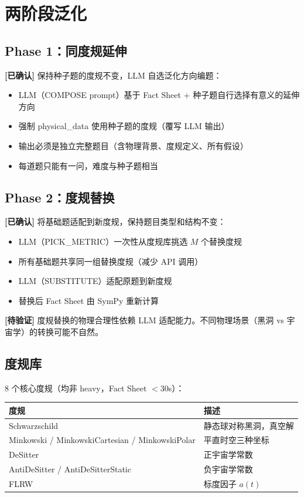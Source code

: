 \documentclass[12pt,a4paper]{article}
\newcommand{\certain}[1]{{\color{certcolor}\textbf{[已确认]}} #1}
\newcommand{\uncertain}[1]{{\color{uncertcolor}\textbf{[待验证]}} #1}
\begin{document}
\section{两阶段泛化}

\subsection{Phase 1：同度规延伸}

\certain{保持种子题的度规不变，LLM 自选泛化方向编题：}

\begin{itemize}
    \item LLM（COMPOSE prompt）基于 Fact Sheet + 种子题自行选择有意义的延伸方向
    \item 强制 physical\_data 使用种子题的度规（覆写 LLM 输出）
    \item 输出必须是独立完整题目（含物理背景、度规定义、所有假设）
    \item 每道题只能有一问，难度与种子题相当
\end{itemize}

\subsection{Phase 2：度规替换}

\certain{将基础题适配到新度规，保持题目类型和结构不变：}

\begin{itemize}
    \item LLM（PICK\_METRIC）一次性从度规库挑选 $M$ 个替换度规
    \item 所有基础题共享同一组替换度规（减少 API 调用）
    \item LLM（SUBSTITUTE）适配原题到新度规
    \item 替换后 Fact Sheet 由 SymPy 重新计算
\end{itemize}

\uncertain{度规替换的物理合理性依赖 LLM 适配能力。不同物理场景（黑洞 vs 宇宙学）的转换可能不自然。}

\subsection{度规库}

8 个核心度规（均非 heavy，Fact Sheet $<30$s）：

\begin{center}
\begin{tabular}{ll}
\toprule
度规 & 描述 \\
\midrule
Schwarzschild & 静态球对称黑洞，真空解 \\
Minkowski / MinkowskiCartesian / MinkowskiPolar & 平直时空三种坐标 \\
DeSitter & 正宇宙学常数 \\
AntiDeSitter / AntiDeSitterStatic & 负宇宙学常数 \\
FLRW & 标度因子 $a(t)$ \\
\bottomrule
\end{tabular}
\end{center}
\end{document}
